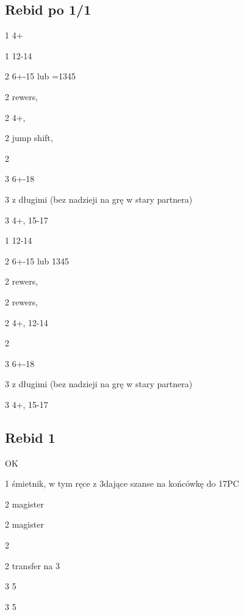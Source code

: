\documentclass[12pt, a4paper]{article}
\begin{document}
\subsection*{Rebid po 1/1}

\sequence{{1\clubs}{1\hearts}}
\begin{options}[1]
    \item[1\spades] 4+\spades \nf
    \item[1\nt] 12-14 \bal
    \item[2\clubs] 6+-15 lub =1345 
    \item[2\diams] rewers, \fonce
    \item[2\hearts] 4+\hearts, \nf
    \item[2\spades] jump shift, \gf
    \item[2\nt] \gf
    \item[3\clubs] 6+-18 
    \item[3\diams] \gf z długimi \clubs (bez nadzieji na grę w stary partnera)  \vimp
    \item[3\hearts] 4+\hearts, 15-17 
\end{options}

\sequence{{1\clubs}{1\spades}}
\begin{options}[1]
    \item[1\nt] 12-14 \bal
    \item[2\clubs] 6+-15 lub 1345\clubs 
    \item[2\diams] rewers, \fonce
    \item[2\hearts] rewers, \fonce
    \item[2\spades] 4+\spades, 12-14
    \item[2\nt] \gf
    \item[3\clubs] 6+-18 
    \item[3\diams] \gf z długimi \clubs (bez nadzieji na grę w stary partnera) \vimp
    \item[3\spades] 4+\spades, 15-17 
\end{options}

\pagebreak
\subsection*{Rebid 1\spades}
\sequence{{1\clubs}{1\hearts}{1\spades}}
\begin{options}[2]
    \item[\pass] OK
    \item[1\nt] śmietnik, w tym ręce z 3\spades dające szanse na końcówkę do 17PC
    \item[2\clubs] magister
    \item[2\diams] magister
    \item[2\hearts] \soff
    \item[2\nt] transfer na 3\clubs \vimp
    \item[3\clubs] 5\clubs \gf \imp
    \item[3\diams] 5\diams \gf \imp
\end{options}
\end{document}

